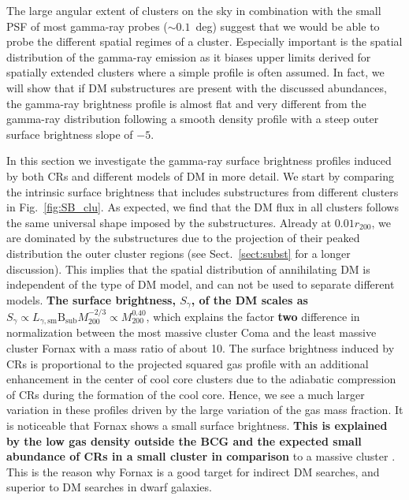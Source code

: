 \documentclass[10pt,aps,pra,reprint,amsmath,amsfonts,amssymb,showpacs,nofootinbib,floatfix]{revtex4-1}
\def\C#1{{\bf #1}}
\newcommand{\rmn}{\mathrm}
\newcommand{\B}{\rmn{B}}
\newcommand{\bsub}{\B_\rmn{sub}}
\newcommand{\rvir}{r_{200}}
\newcommand{\mvir}{M_{200}}
\begin{document}
The large angular extent of clusters on the sky in combination with
the small PSF of most gamma-ray probes ($\sim 0.1$~deg) suggest that
we would be able to probe the different spatial regimes of a
cluster. Especially important is the spatial distribution of the
gamma-ray emission as it biases upper limits derived for spatially
extended clusters where a simple profile is often assumed. In fact, we
will show that if DM substructures are present with the discussed
abundances, the gamma-ray brightness profile is almost flat and very
different from the gamma-ray distribution following a smooth density
profile with a steep outer surface brightness slope of $-5$.

In this section we investigate the gamma-ray surface brightness
profiles induced by both CRs and different models of DM in more
detail. We start by comparing the intrinsic surface brightness that
includes substructures from different clusters in
Fig.~\ref{fig:SB_clu}. As expected, we find that the DM flux in all
clusters follows the same universal shape imposed by the
substructures. Already at $0.01\rvir$, we are dominated by the
substructures due to the projection of their peaked distribution the
outer cluster regions (see Sect.~\ref{sect:subst} for a longer
discussion). This implies that the spatial distribution of
annihilating DM is independent of the type of DM model, and can not be
used to separate different models. \C{The surface brightness,
  $S_\gamma$, of the DM scales as $S_\gamma\propto
  L_{\gamma,\rmn{sm}}\bsub\mvir^{-2/3} \propto \mvir^{0.40}$}, which
explains the factor \C{two} difference in normalization between the
most massive cluster Coma and the least massive cluster Fornax with a
mass ratio of about 10. The surface brightness induced by CRs is
proportional to the projected squared gas profile with an additional
enhancement in the center of cool core clusters due to the adiabatic
compression of CRs during the formation of the cool core. Hence, we
see a much larger variation in these profiles driven by the large
variation of the gas mass fraction. It is noticeable that Fornax shows
a small surface brightness. \C{This is explained by the low gas
  density outside the BCG and the expected small abundance of CRs in a
  small cluster in comparison} to a massive cluster
\cite{2010MNRAS.409..449P}. This is the reason why Fornax is a
good target for indirect DM searches, and superior to DM searches in
dwarf galaxies.
\end{document}

